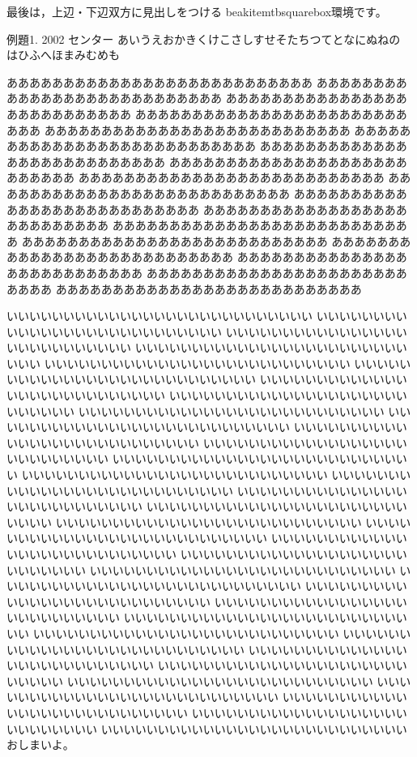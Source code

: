 \documentclass{jarticle}
\begin{document}
最後は，上辺・下辺双方に見出しをつける
\textsf{beakitemtbsquarebox}環境です。

\begin{breakitemtbsquarebox}{例題1. }{2002 センター}
あいうえおかきくけこさしすせそたちつてとなにぬねの
はひふへほまみむめも

あああああああああああああああああああああああああああ
あああああああああああああああああああああああああああ
あああああああああああああああああああああああああああ
あああああああああああああああああああああああああああ
あああああああああああああああああああああああああああ
あああああああああああああああああああああああああああ
あああああああああああああああああああああああああああ
あああああああああああああああああああああああああああ
あああああああああああああああああああああああああああ
あああああああああああああああああああああああああああ
あああああああああああああああああああああああああああ
あああああああああああああああああああああああああああ
あああああああああああああああああああああああああああ
あああああああああああああああああああああああああああ
あああああああああああああああああああああああああああ
あああああああああああああああああああああああああああ
あああああああああああああああああああああああああああ
あああああああああああああああああああああああああああ

いいいいいいいいいいいいいいいいいいいいいいいいいいい
いいいいいいいいいいいいいいいいいいいいいいいいいいい
いいいいいいいいいいいいいいいいいいいいいいいいいいい
いいいいいいいいいいいいいいいいいいいいいいいいいいい
いいいいいいいいいいいいいいいいいいいいいいいいいいい
いいいいいいいいいいいいいいいいいいいいいいいいいいい
いいいいいいいいいいいいいいいいいいいいいいいいいいい
いいいいいいいいいいいいいいいいいいいいいいいいいいい
いいいいいいいいいいいいいいいいいいいいいいいいいいい
いいいいいいいいいいいいいいいいいいいいいいいいいいい
いいいいいいいいいいいいいいいいいいいいいいいいいいい
いいいいいいいいいいいいいいいいいいいいいいいいいいい
いいいいいいいいいいいいいいいいいいいいいいいいいいい
いいいいいいいいいいいいいいいいいいいいいいいいいいい
いいいいいいいいいいいいいいいいいいいいいいいいいいい
いいいいいいいいいいいいいいいいいいいいいいいいいいい
いいいいいいいいいいいいいいいいいいいいいいいいいいい
いいいいいいいいいいいいいいいいいいいいいいいいいいい
いいいいいいいいいいいいいいいいいいいいいいいいいいい
いいいいいいいいいいいいいいいいいいいいいいいいいいい
いいいいいいいいいいいいいいいいいいいいいいいいいいい
いいいいいいいいいいいいいいいいいいいいいいいいいいい
いいいいいいいいいいいいいいいいいいいいいいいいいいい
いいいいいいいいいいいいいいいいいいいいいいいいいいい
いいいいいいいいいいいいいいいいいいいいいいいいいいい
いいいいいいいいいいいいいいいいいいいいいいいいいいい
いいいいいいいいいいいいいいいいいいいいいいいいいいい
いいいいいいいいいいいいいいいいいいいいいいいいいいい
いいいいいいいいいいいいいいいいいいいいいいいいいいい
いいいいいいいいいいいいいいいいいいいいいいいいいいい
いいいいいいいいいいいいいいいいいいいいいいいいいいい
いいいいいいいいいいいいいいいいいいいいいいいいいいい
いいいいいいいいいいいいいいいいいいいいいいいいいいい
いいいいいいいいいいいいいいいいいいいいいいいいいいい
いいいいいいいいいいいいいいいいいいいいいいいいいいい
おしまいよ。
\end{breakitemtbsquarebox}
\end{document}
